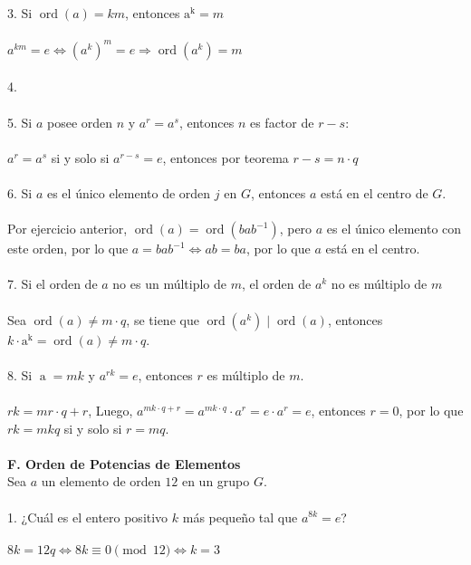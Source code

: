 \documentclass{article}
\begin{document}
\\
\\
3. Si $\operatorname{ord}(a)=km$, entonces $\operatorname{a^{k}}=m$
\\
\\
$a^{km}=e \Longleftrightarrow (a^{k})^{m}=e \Longrightarrow \operatorname{ord}(a^{k})=m$
\\
\\
4.
\\
\\
5. Si $a$ posee orden $n$ y $a^{r}=a^{s}$, entonces $n$ es factor de $r-s$:
\\
\\
$a^{r}=a^{s}$ si y solo si $a^{r-s}=e$, entonces por teorema $r-s=n \cdot q$
\\
\\
6. Si $a$ es el único elemento de orden $j$ en $G$, entonces $a$ está en el centro de $G$.
\\
\\
Por ejercicio anterior, $\operatorname{ord}(a)=\operatorname{ord}(bab^{-1})$, pero $a$ es el único elemento con este orden, por lo que $a=bab^{-1} \Longleftrightarrow ab = ba$, por lo que $a$ está en el centro.
\\
\\
7. Si el orden de $a$ no es un múltiplo de $m$, el orden de $a^{k}$ no es múltiplo de $m$
\\
\\
Sea $\operatorname{ord}(a) \neq m \cdot q$, se tiene que $\operatorname{ord}(a^{k}) \mid \operatorname{ord}(a)$, entonces $k \cdot \operatorname{a^{k}}=\operatorname{ord}(a) \neq m \cdot q$.
\\
\\
8. Si $\operatorname{a}=mk$ y $a^{rk}=e$, entonces $r$ es múltiplo de $m$.
\\
\\
$rk=mr \cdot q + r$, Luego, $a^{mk \cdot q +r}=a^{mk \cdot q} \cdot a^{r}=e \cdot a^{r}=e$, entonces $r=0$, por lo que $rk=mkq$ si y solo si $r=mq$.
\\
\\
\textbf{F. Orden de Potencias de Elementos}
\\
Sea $a$ un elemento de orden $12$ en un grupo $G$.
\\
\\
1. ¿Cuál es el entero positivo $k$ más pequeño tal que $a^{8k}=e$?
\\
\\
$8k = 12q \Longleftrightarrow 8k \equiv 0 \pmod{12} \Longleftrightarrow k=3$
\end{document}
